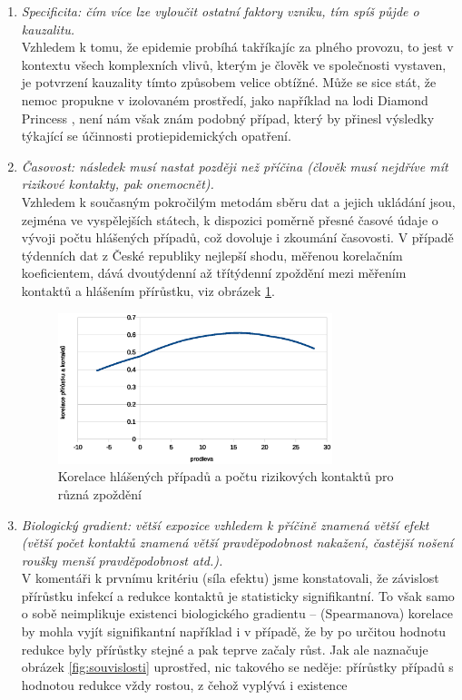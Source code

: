 \begin{enumerate}
\item \emph{Specificita: čím více lze vyloučit ostatní faktory vzniku, tím
spíš půjde o kauzalitu.}\\
Vzhledem k tomu, že epidemie probíhá takříkajíc za plného provozu,
to jest v kontextu všech komplexních vlivů, kterým je člověk ve společnosti
vystaven, je potvrzení kauzality tímto způsobem velice obtížné.
Může se sice stát, že nemoc propukne v izolovaném prostředí, jako
například na lodi Diamond Princess \cite{mizumoto2020transmission},
není nám však znám podobný případ, který by přinesl výsledky týkající
se účinnosti protiepidemických opatření. 
\item \emph{Časovost: následek musí nastat později než příčina (člověk musí
nejdříve mít rizikové kontakty, pak onemocnět).}\\
Vzhledem k současným pokročilým metodám sběru dat a jejich ukládání
jsou, zejména ve vyspělejších státech, k dispozici poměrně přesné
časové údaje o vývoji počtu hlášených případů, což dovoluje i zkoumání časovosti.
V případě týdenních dat z České republiky nejlepší shodu, měřenou
korelačním koeficientem, dává dvoutýdenní až třítýdenní zpoždění mezi měřením
kontaktů a hlášením přírůstku, viz obrázek \ref{fig:korelace}.
\begin{figure}
\begin{center}
\includegraphics[width=8cm]{pic/lagsel.eps}
\caption{Korelace hlášených případů a počtu rizikových kontaktů pro různá zpoždění}
\label{fig:korelace}
\end{center}
\end{figure}
\item \emph{Biologický gradient: větší expozice vzhledem k příčině znamená
větší efekt (větší počet kontaktů znamená větší pravděpodobnost nakažení,
častější nošení roušky menší pravděpodobnost atd.).}\\
V komentáři k prvnímu kritériu (síla efektu) jsme konstatovali, že závislost přírůstku infekcí a redukce kontaktů je statisticky signifikantní. To však samo o sobě neimplikuje existenci biologického gradientu -- (Spearmanova) korelace by mohla vyjít signifikantní například i v případě, že by po určitou hodnotu redukce byly přírůstky stejné a pak teprve začaly růst. Jak ale naznačuje obrázek \ref{fig:souvislosti} uprostřed, nic takového se neděje: přírůstky případů s hodnotou redukce vždy rostou, z čehož vyplývá i existence

\end{enumerate}
